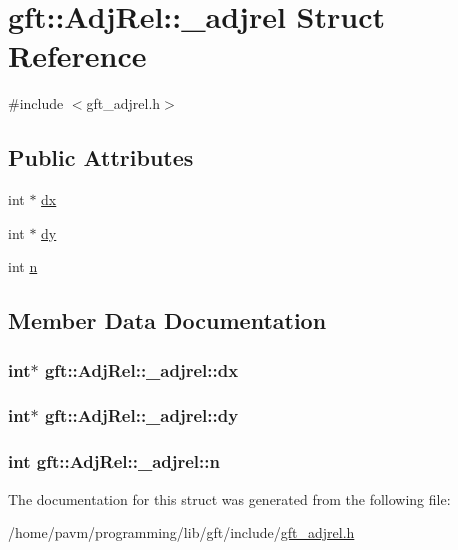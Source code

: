 \hypertarget{structgft_1_1AdjRel_1_1__adjrel}{\section{gft\-:\-:Adj\-Rel\-:\-:\-\_\-adjrel Struct Reference}
\label{structgft_1_1AdjRel_1_1__adjrel}
}


{\ttfamily \#include $<$gft\-\_\-adjrel.\-h$>$}

\subsection*{Public Attributes}
\begin{DoxyCompactItemize}
\item 
int $\ast$ \hyperlink{structgft_1_1AdjRel_1_1__adjrel_ace7ee2f2817026586276cc2f91678c41}{dx}
\item 
int $\ast$ \hyperlink{structgft_1_1AdjRel_1_1__adjrel_affcd3ebc7e12319eb38e4103dea77d04}{dy}
\item 
int \hyperlink{structgft_1_1AdjRel_1_1__adjrel_a2728c9b893dfb77f919d79963cda39d8}{n}
\end{DoxyCompactItemize}


\subsection{Member Data Documentation}
\hypertarget{structgft_1_1AdjRel_1_1__adjrel_ace7ee2f2817026586276cc2f91678c41}{
\subsubsection[{dx}]{\setlength{\rightskip}{0pt plus 5cm}int$\ast$ gft\-::\-Adj\-Rel\-::\-\_\-adjrel\-::dx}}\label{structgft_1_1AdjRel_1_1__adjrel_ace7ee2f2817026586276cc2f91678c41}
\hypertarget{structgft_1_1AdjRel_1_1__adjrel_affcd3ebc7e12319eb38e4103dea77d04}{
\subsubsection[{dy}]{\setlength{\rightskip}{0pt plus 5cm}int$\ast$ gft\-::\-Adj\-Rel\-::\-\_\-adjrel\-::dy}}\label{structgft_1_1AdjRel_1_1__adjrel_affcd3ebc7e12319eb38e4103dea77d04}
\hypertarget{structgft_1_1AdjRel_1_1__adjrel_a2728c9b893dfb77f919d79963cda39d8}{
\subsubsection[{n}]{\setlength{\rightskip}{0pt plus 5cm}int gft\-::\-Adj\-Rel\-::\-\_\-adjrel\-::n}}\label{structgft_1_1AdjRel_1_1__adjrel_a2728c9b893dfb77f919d79963cda39d8}


The documentation for this struct was generated from the following file\-:\begin{DoxyCompactItemize}
\item 
/home/pavm/programming/lib/gft/include/\hyperlink{gft__adjrel_8h}{gft\-\_\-adjrel.\-h}\end{DoxyCompactItemize}
